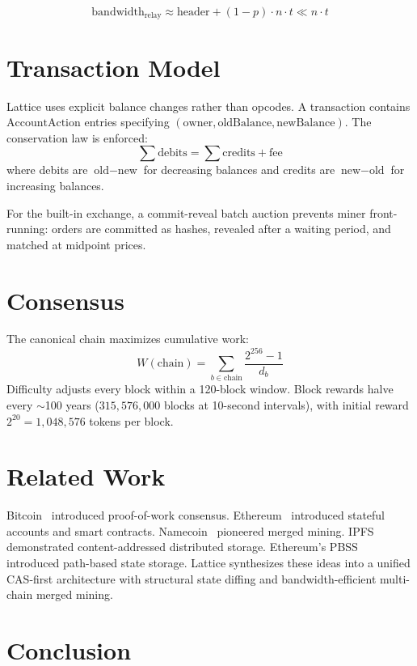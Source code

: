 \documentclass[11pt,a4paper]{article}
\begin{document}
\[
\text{bandwidth}_\text{relay} \approx \text{header} + (1-p) \cdot n \cdot t \ll n \cdot t
\]

\section{Transaction Model}

Lattice uses explicit balance changes rather than opcodes. A transaction contains $\text{AccountAction}$ entries specifying $(\text{owner}, \text{oldBalance}, \text{newBalance})$. The conservation law is enforced:
\[
\sum \text{debits} = \sum \text{credits} + \text{fee}
\]
where debits are $\text{old} - \text{new}$ for decreasing balances and credits are $\text{new} - \text{old}$ for increasing balances.

For the built-in exchange, a commit-reveal batch auction prevents miner front-running: orders are committed as hashes, revealed after a waiting period, and matched at midpoint prices.

\section{Consensus}

The canonical chain maximizes cumulative work:
\[
W(\text{chain}) = \sum_{b \in \text{chain}} \frac{2^{256} - 1}{d_b}
\]
Difficulty adjusts every block within a 120-block window. Block rewards halve every $\sim$100 years ($315{,}576{,}000$ blocks at 10-second intervals), with initial reward $2^{20} = 1{,}048{,}576$ tokens per block.

\section{Related Work}

Bitcoin~\cite{nakamoto2008} introduced proof-of-work consensus. Ethereum~\cite{buterin2013} introduced stateful accounts and smart contracts. Namecoin~\cite{namecoin2011} pioneered merged mining. IPFS~\cite{benet2014} demonstrated content-addressed distributed storage. Ethereum's PBSS~\cite{chen2023} introduced path-based state storage. Lattice synthesizes these ideas into a unified CAS-first architecture with structural state diffing and bandwidth-efficient multi-chain merged mining.

\section{Conclusion}
\end{document}
